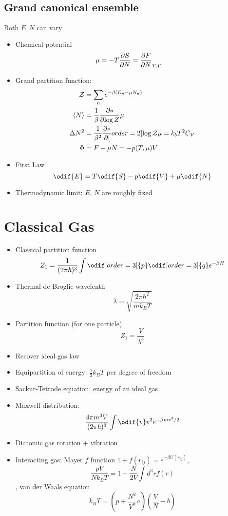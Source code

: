 \subsection*{Grand canonical ensemble}
Both $E,N$ can vary
\begin{itemize}
    
\item 
Chemical potential \begin{align*}
    \mu &= -T\frac{\partial{S}}{\partial{N}} =  \frac{\partial{F}}{\partial{N}}_{T,V}
\end{align*}
\item Grand partition function:
\begin{align*}
    \mathcal{Z} &= \sum_n e^{-\beta(E_n-\mu N_n)} \\
    \left\langle N\right\rangle &= \frac{1}{\beta}\frac{\partial{*}}{\partial{\log Z}}{\mu}\\
    \Delta N^2 &= \frac{1}{\beta^2}\frac{\partial{*}}{\partial{[}}order=2]{\log \mathcal{Z}}{\mu} = k_b T^2 C_V\\
    \Phi &= F-\mu N = -p(T,\mu)V
\end{align*}
\item First Law \[\odif{E} = T\odif{S} -p\odif{V} + \mu \odif{N}\]
\item Thermodynamic limit: $E$, $N$ are roughly fixed
\end{itemize}
\section{Classical Gas}
\begin{itemize}
    \item Classical partition function \[Z_1 = \frac{1}{(2\pi\hbar)^3} \int\odif[order=3]{p} \odif[order=3]{q} e^{-\beta H}\]
    \item Thermal de Broglie wavelenth \[\lambda = \sqrt{\frac{2\pi \hbar^2}{mk_BT}}\]
    \item Partition function (for one particle)
    \[Z_1 = \frac{V}{\lambda^3}\]
    \item Recover ideal gas law
    \item Equipartition of energy: $\frac{1}{2}k_BT$ per degree of freedom
    \item Sackur-Tetrode equation: energy of an ideal gas
    \item Maxwell distribution:
    \[\frac{4\pi m^3V}{(2\pi\hbar)^3}\int\odif{v}v^2 e^{-\beta mv^2/2}\]
    \item Diatomic gas rotation + vibration
    \item Interacting gas: Mayer $f$ function $1+f(r_{ij}) = e^{-\beta U(r_{ij})}$, 
    \[\frac{pV}{Nk_B T} = 1-\frac{N}{2V} \int d^3 r f(r)\], van der Waals equation \[k_B T = \left( p + \frac{N^2}{V^2}a\right) \left( \frac{V}{N} - b \right)\]
\end{itemize}
